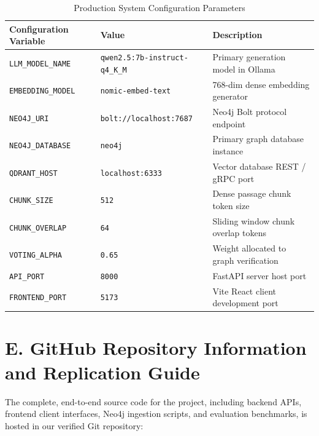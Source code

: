 \begin{table}[htbp]
\centering
\caption{Production System Configuration Parameters}
\label{tab:config_parameters}
\begin{tabular}{lll}
\toprule
\textbf{Configuration Variable} & \textbf{Value} & \textbf{Description} \\
\midrule
\texttt{LLM\_MODEL\_NAME} & \texttt{qwen2.5:7b-instruct-q4\_K\_M} & Primary generation model in Ollama \\
\texttt{EMBEDDING\_MODEL} & \texttt{nomic-embed-text} & 768-dim dense embedding generator \\
\texttt{NEO4J\_URI} & \texttt{bolt://localhost:7687} & Neo4j Bolt protocol endpoint \\
\texttt{NEO4J\_DATABASE} & \texttt{neo4j} & Primary graph database instance \\
\texttt{QDRANT\_HOST} & \texttt{localhost:6333} & Vector database REST / gRPC port \\
\texttt{CHUNK\_SIZE} & \texttt{512} & Dense passage chunk token size \\
\texttt{CHUNK\_OVERLAP} & \texttt{64} & Sliding window chunk overlap tokens \\
\texttt{VOTING\_ALPHA} & \texttt{0.65} & Weight allocated to graph verification \\
\texttt{API\_PORT} & \texttt{8000} & FastAPI server host port \\
\texttt{FRONTEND\_PORT} & \texttt{5173} & Vite React client development port \\
\bottomrule
\end{tabular}
\end{table}

\section*{E. GitHub Repository Information and Replication Guide}
The complete, end-to-end source code for the project, including backend APIs, frontend client interfaces, Neo4j ingestion scripts, and evaluation benchmarks, is hosted in our verified Git repository:

\begin{center}
\end{center}

